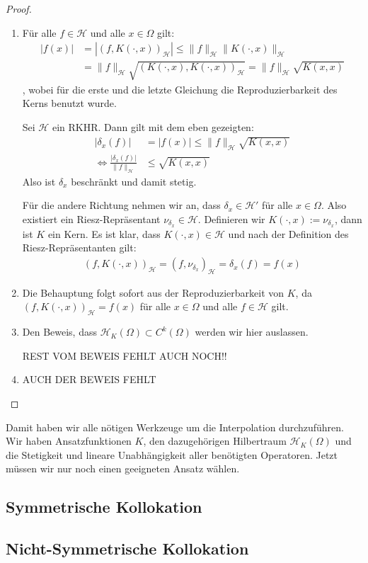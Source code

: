 \begin{proof}
\begin{enumerate}
\item Für alle $f \in \mathcal{H}$ und alle $x \in \Omega$ gilt:
\begin{align*}
|f(x)| &= |(f, K(\cdot,x))_\mathcal{H}| \le \|f\|_\mathcal{H}\|K(\cdot,x)\|_\mathcal{H}\\
&= \|f\|_\mathcal{H} \sqrt{(K(\cdot,x),K(\cdot,x))_\mathcal{H}} = \|f\|_\mathcal{H} \sqrt{K(x,x)}
\end{align*}
, wobei für die erste und die letzte Gleichung die Reproduzierbarkeit des Kerns benutzt wurde.

Sei $\mathcal{H}$ ein \ac{RKHR}. Dann gilt mit dem eben gezeigten:
\begin{align*}
|\delta_x(f)| &= |f(x)| \le \|f\|_\mathcal{H} \sqrt{K(x,x)}\\
\Leftrightarrow \frac{|\delta_x(f)|}{\|f\|_\mathcal{H}} &\le \sqrt{K(x,x)}
\end{align*}
Also ist $\delta_x$ beschränkt und damit stetig.

Für die andere Richtung nehmen wir an, dass $\delta_x  \in \mathcal{H}'$ für alle $x \in \Omega$. Also existiert ein Riesz-Repräsentant $\nu_{\delta_x} \in \mathcal{H}$. Definieren wir $K(\cdot,x):= \nu_{\delta_x}$, dann ist $K$ ein Kern. Es ist klar, dass $K(\cdot,x) \in \mathcal{H}$ und nach der Definition des Riesz-Repräsentanten gilt:
\begin{align*}
(f, K(\cdot,x))_\mathcal{H} = (f, \nu_{\delta_x})_\mathcal{H} = \delta_x(f) = f(x)
\end{align*}
\item Die Behauptung folgt sofort aus der Reproduzierbarkeit von $K$, da $(f, K(\cdot,x))_\mathcal{H}= f(x)$ für alle $x \in \Omega$ und alle $f \in \mathcal{H}$ gilt.
\item
Den Beweis, dass $\mathcal{H}_K(\Omega) \subset C^k(\Omega)$ werden wir hier auslassen.

REST VOM BEWEIS FEHLT AUCH NOCH!!
\item AUCH DER BEWEIS FEHLT
\end{enumerate}
\end{proof}

Damit haben wir alle nötigen Werkzeuge um die Interpolation durchzuführen. Wir haben Ansatzfunktionen $K$, den dazugehörigen Hilbertraum $\mathcal{H}_K(\Omega)$ und die Stetigkeit und lineare Unabhängigkeit aller benötigten Operatoren. Jetzt müssen wir nur noch einen geeigneten Ansatz wählen.
\subsection{Symmetrische Kollokation}
\subsection{Nicht-Symmetrische Kollokation}